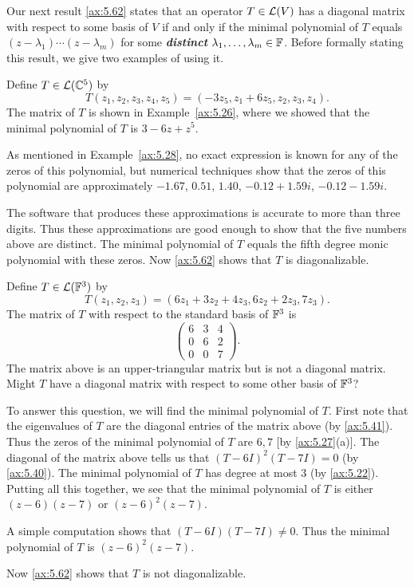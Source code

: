 Our next result \ref{ax:5.62} states that an operator $T\in\mathcal{L}(V)$ has a
diagonal matrix with respect to some basis of $V$ if and only if the minimal
polynomial of $T$ equals $(z-\lambda_1)\cdots(z-\lambda_m)$ for some
\textbf{\emph{distinct}} $\lambda_1,\dots,\lambda_m\in\mathbb{F}$. Before formally
stating this result, we give two examples of using it.

\begin{example}%
\label{ax:5.60}
Define $T\in\mathcal{L}(\mathbb{C}^5)$ by
\[ T(z_1,z_2,z_3,z_4,z_5)=(-3z_5,z_1+6z_5,z_2,z_3,z_4). \]
The matrix of $T$ is shown in Example~\ref{ax:5.26}, where we showed that the
minimal polynomial of $T$ is $3-6z+z^5$.

As mentioned in Example~\ref{ax:5.28}, no exact expression is known for any of
the zeros of this polynomial, but numerical techniques show that the zeros of
this polynomial are approximately $-1.67$, $0.51$, $1.40$, $-0.12+1.59i$,
$-0.12-1.59i$.

The software that produces these approximations is accurate to more than three
digits. Thus these approximations are good enough to show that the five numbers
above are distinct. The minimal polynomial of $T$ equals the fifth degree monic
polynomial with these zeros. Now \ref{ax:5.62} shows that $T$ is
diagonalizable.
\end{example}

\begin{example}\label{ax:5.61}
Define $T\in\mathcal{L}(\mathbb{F}^3)$ by
\[ T(z_1,z_2,z_3)=(6z_1+3z_2+4z_3,6z_2+2z_3,7z_3). \]
The matrix of $T$ with respect to the standard basis of $\mathbb{F}^3$ is
\[ \begin{pmatrix} 6&3&4\\ 0&6&2\\ 0&0&7 \end{pmatrix}. \]
The matrix above is an upper-triangular matrix but is not a diagonal matrix.
Might $T$ have a diagonal matrix with respect to some other basis of $\mathbb{F}^3$?

To answer this question, we will find the minimal polynomial of $T$. First note
that the eigenvalues of $T$ are the diagonal entries of the matrix above (by
\ref{ax:5.41}). Thus the zeros of the minimal polynomial of $T$ are $6,7$
[by \ref{ax:5.27}(a)]. The diagonal of the matrix above tells us that
$(T-6I)^2(T-7I)=0$ (by \ref{ax:5.40}). The minimal polynomial of $T$ has degree
at most $3$ (by \ref{ax:5.22}). Putting all this together, we see that the
minimal polynomial of $T$ is either $(z-6)(z-7)$ or $(z-6)^2(z-7)$.

A simple computation shows that $(T-6I)(T-7I)\ne0$. Thus the minimal polynomial
of $T$ is $(z-6)^2(z-7)$.

Now \ref{ax:5.62} shows that $T$ is not diagonalizable.
\end{example}

